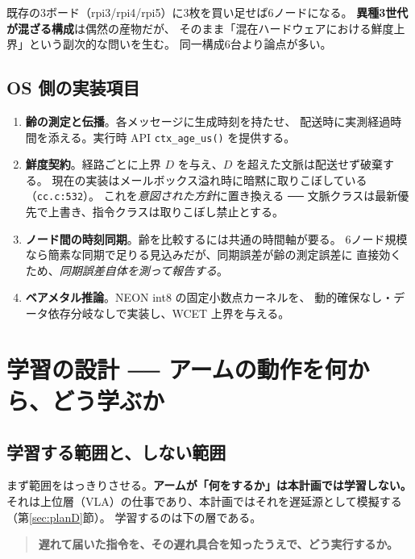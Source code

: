 \documentclass[11pt,a4paper]{article}
\newcommand{\code}[1]{\texttt{#1}}
\newcommand{\prob}[1]{\textbf{\textcolor{red!55!black}{#1}}}
\newcommand{\keyp}[1]{\textbf{\textcolor{blue!45!black}{#1}}}
\begin{document}
\noindent
既存の3ボード（rpi3/rpi4/rpi5）に3枚を買い足せば6ノードになる。
\keyp{異種3世代が混ざる構成}は偶然の産物だが、
そのまま「混在ハードウェアにおける鮮度上界」という副次的な問いを生む。
同一構成6台より論点が多い。

\subsection{OS 側の実装項目}

\begin{enumerate}[leftmargin=1.6em,itemsep=3pt]
  \item \keyp{齢の測定と伝播}。各メッセージに生成時刻を持たせ、
        配送時に実測経過時間を添える。実行時 API \code{ctx\_age\_us()} を提供する。
  \item \keyp{鮮度契約}。経路ごとに上界 $D$ を与え、$D$ を超えた文脈は配送せず破棄する。
        現在の実装はメールボックス溢れ時に暗黙に取りこぼしている（\code{cc.c:532}）。
        これを\emph{意図された方針}に置き換える ──
        文脈クラスは最新優先で上書き、指令クラスは取りこぼし禁止とする。
  \item \keyp{ノード間の時刻同期}。齢を比較するには共通の時間軸が要る。
        6ノード規模なら簡素な同期で足りる見込みだが、同期誤差が齢の測定誤差に
        直接効くため、\emph{同期誤差自体を測って報告する}。
  \item \keyp{ベアメタル推論}。NEON int8 の固定小数点カーネルを、
        動的確保なし・データ依存分岐なしで実装し、WCET 上界を与える。
\end{enumerate}

\section{学習の設計 ── アームの動作を何から、どう学ぶか}
\label{sec:learn}

\subsection{学習する範囲と、しない範囲}

まず範囲をはっきりさせる。\prob{アームが「何をするか」は本計画では学習しない。}
それは上位層（VLA）の仕事であり、本計画ではそれを遅延源として模擬する（第\ref{sec:planD}節）。
学習するのは下の層である。

\begin{quote}
\keyp{遅れて届いた指令を、その遅れ具合を知ったうえで、どう実行するか。}
\end{quote}
\end{document}
